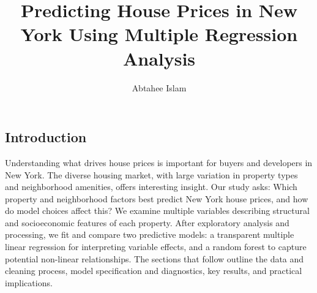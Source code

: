 \documentclass[letterpaper,9pt,twocolumn,twoside,]{pinp}
\title{Predicting House Prices in New York Using Multiple Regression
Analysis}
\author[]{Abtahee Islam}
\begin{document}
\verticaladjustment{-2pt}

\maketitle
\thispagestyle{firststyle}



\subsection{Introduction}\label{introduction}

Understanding what drives house prices is important for buyers and
developers in New York. The diverse housing market, with large variation
in property types and neighborhood amenities, offers interesting
insight. Our study asks: Which property and neighborhood factors best
predict New York house prices, and how do model choices affect this? We
examine multiple variables describing structural and socioeconomic
features of each property. After exploratory analysis and processing, we
fit and compare two predictive models: a transparent multiple linear
regression for interpreting variable effects, and a random forest to
capture potential non-linear relationships. The sections that follow
outline the data and cleaning process, model specification and
diagnostics, key results, and practical implications.
\end{document}
